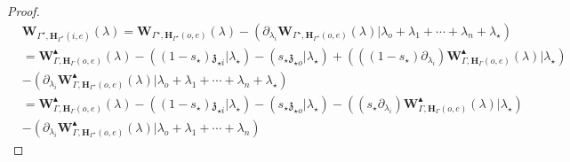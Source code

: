 \documentclass[11pt]{amsart}
\theoremstyle{definition}
\theoremstyle{remark}
\numberwithin{equation}{section}
\begin{document}
\begin{proof}
\begin{align*}
   &\mathbf{W}_{\Gamma^{\star},\mathbf{H}_{\Gamma^{\star}}(i,e)}(\lambda)=\mathbf{W}_{\Gamma^{\star},\mathbf{H}_{\Gamma^{\star}}(o,e)}(\lambda)-\left(\partial_{\lambda_i}\mathbf{W}_{\Gamma^{\star},\mathbf{H}_{\Gamma^{\star}}(o,e)}(\lambda)|\lambda_o+\lambda_1+\cdots+\lambda_n+\lambda_{\star}\right)  \\
   & =\mathbf{W}^{\blacktriangle}_{\Gamma,\mathbf{H}_{\Gamma}(o,e)}(\lambda)-\left((1-s_{\star})\mathfrak{z}_{\star i}|\lambda_{\star}\right)-\left(s_{\star}\mathfrak{z}_{\star o}|\lambda_{\star}\right)+\left(((1-s_{\star})\partial_{\lambda_i})\mathbf{W}^{\blacktriangle}_{\Gamma,\mathbf{H}_{\Gamma}(o,e)}(\lambda)|\lambda_{\star}\right)\\
   &-\left(\partial_{\lambda_i}\mathbf{W}^{\blacktriangle}_{\Gamma,\mathbf{H}_{\Gamma^{\star}}(o,e)}(\lambda)|\lambda_o+\lambda_1+\cdots+\lambda_n+\lambda_{\star}\right)  \\
    &  =\mathbf{W}^{\blacktriangle}_{\Gamma,\mathbf{H}_{\Gamma}(o,e)}(\lambda)-\left((1-s_{\star})\mathfrak{z}_{\star i}|\lambda_{\star}\right)-\left(s_{\star}\mathfrak{z}_{\star o}|\lambda_{\star}\right)-\left((s_{\star}\partial_{\lambda_i})\mathbf{W}^{\blacktriangle}_{\Gamma,\mathbf{H}_{\Gamma}(o,e)}(\lambda)|\lambda_{\star}\right)\\
   &-\left(\partial_{\lambda_i}\mathbf{W}^{\blacktriangle}_{\Gamma,\mathbf{H}_{\Gamma^{\star}}(o,e)}(\lambda)|\lambda_o+\lambda_1+\cdots+\lambda_n\right)
\end{align*}


\end{proof}
\end{document}

